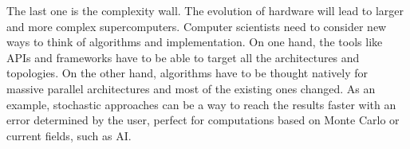 The last one is the complexity wall.
The evolution of hardware will lead to larger and more complex supercomputers. 
Computer scientists need to consider new ways to think of algorithms and implementation. 
On one hand, the tools like APIs and frameworks have to be able to target all the architectures and topologies.
On the other hand, algorithms have to be thought natively for massive parallel architectures and most of the existing ones changed.
As an example, stochastic approaches can be a way to reach the results faster with an error determined by the user, perfect for computations based on Monte Carlo or current fields, such as AI.
